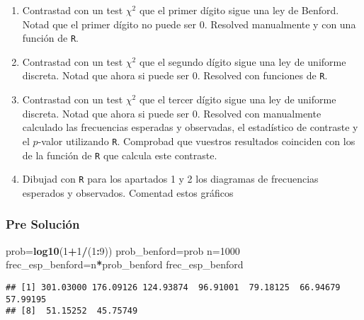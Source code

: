 \documentclass[
]{article}
\newenvironment{Shaded}{\begin{snugshade}}{\end{snugshade}}
\newcommand{\DecValTok}[1]{\textcolor[rgb]{0.00,0.00,0.81}{#1}}
\newcommand{\KeywordTok}[1]{\textcolor[rgb]{0.13,0.29,0.53}{\textbf{#1}}}
\newcommand{\NormalTok}[1]{#1}
\newcommand{\OperatorTok}[1]{\textcolor[rgb]{0.81,0.36,0.00}{\textbf{#1}}}
\providecommand{\tightlist}{%
  \setlength{\itemsep}{0pt}\setlength{\parskip}{0pt}}
\begin{document}
\begin{enumerate}
\def\labelenumi{\arabic{enumi}.}
\tightlist
\item
  Contrastad con un test \(\chi^2\) que el primer dígito sigue una ley
  de Benford. Notad que el primer dígito no puede ser 0. Resolved
  manualmente y con una función de \texttt{R}.\\
\item
  Contrastad con un test \(\chi^2\) que el segundo dígito sigue una ley
  de uniforme discreta. Notad que ahora si puede ser 0. Resolved con
  funciones de \texttt{R}.\\
\item
  Contrastad con un test \(\chi^2\) que el tercer dígito sigue una ley
  de uniforme discreta. Notad que ahora si puede ser 0. Resolved con
  manualmente calculado las frecuencias esperadas y observadas, el
  estadístico de contraste y el \(p\)-valor utilizando \texttt{R}.
  Comprobad que vuestros resultados coinciden con los de la función de
  \texttt{R} que calcula este contraste.\\
\item
  Dibujad con \texttt{R} para los apartados 1 y 2 los diagramas de
  frecuencias esperados y observados. Comentad estos gráficos
\end{enumerate}

\hypertarget{pre-soluciuxf3n}{%
\subsubsection{Pre Solución}\label{pre-soluciuxf3n}}

\begin{Shaded}
\begin{Highlighting}[]
\NormalTok{prob=}\KeywordTok{log10}\NormalTok{(}\DecValTok{1}\OperatorTok{+}\DecValTok{1}\OperatorTok{/}\NormalTok{(}\DecValTok{1}\OperatorTok{:}\DecValTok{9}\NormalTok{))}
\NormalTok{prob_benford=prob}
\NormalTok{n=}\DecValTok{1000}
\NormalTok{frec_esp_benford=n}\OperatorTok{*}\NormalTok{prob_benford}
\NormalTok{frec_esp_benford}
\end{Highlighting}
\end{Shaded}

\begin{verbatim}
## [1] 301.03000 176.09126 124.93874  96.91001  79.18125  66.94679  57.99195
## [8]  51.15252  45.75749
\end{verbatim}

\begin{Shaded}
\end{Shaded}
\end{document}
